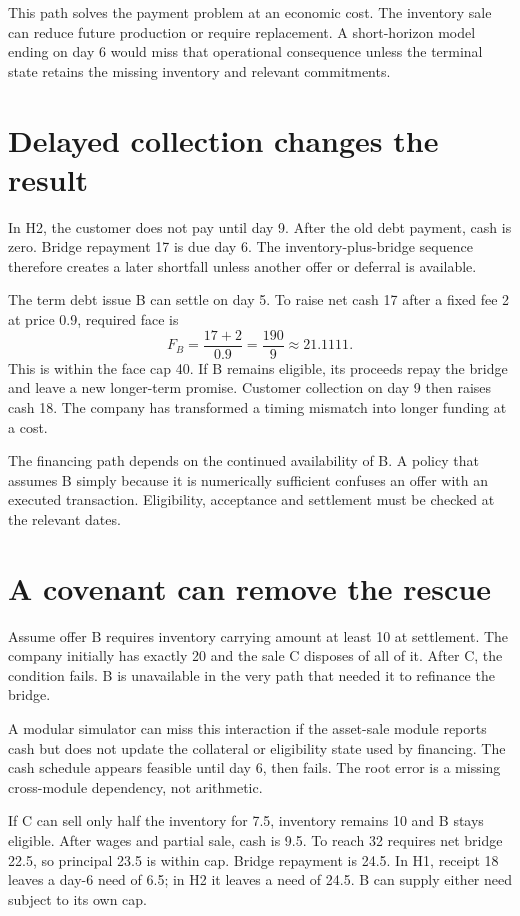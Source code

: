 This path solves the payment problem at an economic cost. The inventory sale can reduce future production or require replacement. A short-horizon model ending on day 6 would miss that operational consequence unless the terminal state retains the missing inventory and relevant commitments.

\section{Delayed collection changes the result}
In H2, the customer does not pay until day 9. After the old debt payment, cash is zero. Bridge repayment 17 is due day 6. The inventory-plus-bridge sequence therefore creates a later shortfall unless another offer or deferral is available.

The term debt issue B can settle on day 5. To raise net cash 17 after a fixed fee 2 at price 0.9, required face is
\begin{equation}
 F_B=\frac{17+2}{0.9}=\frac{190}{9}\approx21.1111.
\end{equation}
This is within the face cap 40. If B remains eligible, its proceeds repay the bridge and leave a new longer-term promise. Customer collection on day 9 then raises cash 18. The company has transformed a timing mismatch into longer funding at a cost.

The financing path depends on the continued availability of B. A policy that assumes B simply because it is numerically sufficient confuses an offer with an executed transaction. Eligibility, acceptance and settlement must be checked at the relevant dates.

\section{A covenant can remove the rescue}
Assume offer B requires inventory carrying amount at least 10 at settlement. The company initially has exactly 20 and the sale C disposes of all of it. After C, the condition fails. B is unavailable in the very path that needed it to refinance the bridge.

A modular simulator can miss this interaction if the asset-sale module reports cash but does not update the collateral or eligibility state used by financing. The cash schedule appears feasible until day 6, then fails. The root error is a missing cross-module dependency, not arithmetic.

If C can sell only half the inventory for 7.5, inventory remains 10 and B stays eligible. After wages and partial sale, cash is 9.5. To reach 32 requires net bridge 22.5, so principal 23.5 is within cap. Bridge repayment is 24.5. In H1, receipt 18 leaves a day-6 need of 6.5; in H2 it leaves a need of 24.5. B can supply either need subject to its own cap.

